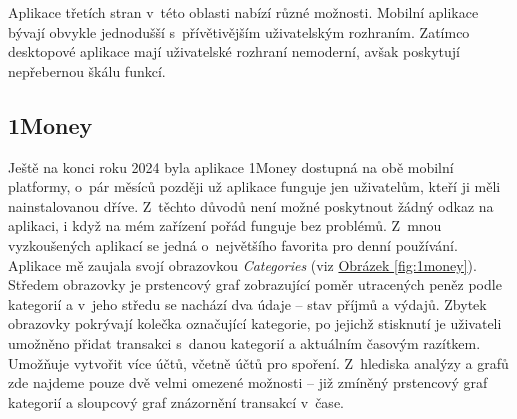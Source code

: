 \documentclass[
  biblatex,
  figures=true,
  tables=false,
  glossaries,
  index
]{kidiplom}
\begin{document}
Aplikace třetích stran v~této oblasti nabízí různé možnosti. Mobilní aplikace bývají obvykle jednodušší s~přívětivějším uživatelským rozhraním. Zatímco desktopové aplikace mají uživatelské rozhraní nemoderní, avšak poskytují nepřebernou škálu funkcí.

\subsection{1Money}
Ještě na konci roku 2024 byla aplikace 1Money dostupná na obě mobilní platformy, o~pár měsíců později už aplikace funguje jen uživatelům, kteří ji měli nainstalovanou dříve. Z~těchto důvodů není možné poskytnout žádný odkaz na aplikaci, i když na mém zařízení pořád funguje bez problémů. Z~mnou vyzkoušených aplikací se jedná o~největšího favorita pro denní používání. Aplikace mě zaujala svojí obrazovkou \textit{Categories} (viz \hyperref[fig:1money]{Obrázek \ref{fig:1money}}).  Středem obrazovky je prstencový graf zobrazující poměr utracených peněz podle kategorií a v~jeho středu se nachází dva údaje -- stav příjmů a výdajů. Zbytek obrazovky pokrývají kolečka označující kategorie, po jejichž stisknutí je uživateli umožněno přidat transakci s~danou kategorií a aktuálním časovým razítkem. Umožňuje vytvořit více účtů, včetně účtů pro spoření. Z~hlediska analýzy a grafů zde najdeme pouze dvě velmi omezené možnosti -- již zmíněný prstencový graf kategorií a sloupcový graf znázornění transakcí v~čase.
\end{document}
